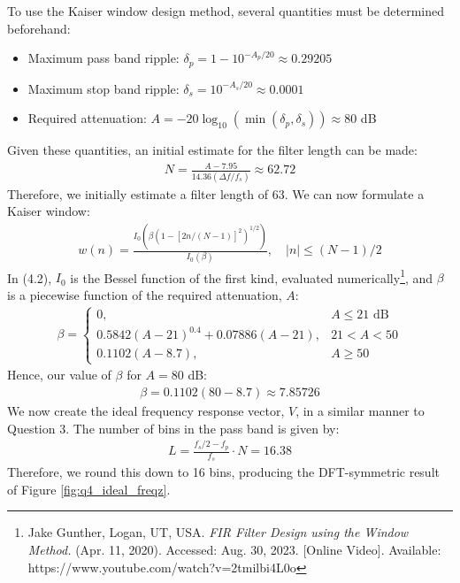 To use the Kaiser window design method, several quantities must be determined beforehand:
\begin{itemize}
    \item Maximum pass band ripple: $\delta_p = 1 - 10^{-A_p / 20} \approx 0.29205$
    \item Maximum stop band ripple: $\delta_s = 10^{-A_s / 20} \approx 0.0001$
    \item Required attenuation: $A = -20\log_{10}(\min(\delta_p, \delta_s)) \approx 80$ dB
\end{itemize}
Given these quantities, an initial estimate for the filter length can be made:
\begin{align}
    N = \frac{A - 7.95}{14.36(\Delta f / f_s)} \approx 62.72
\end{align}
Therefore, we initially estimate a filter length of 63. We can now formulate a Kaiser window:
\begin{align}
    w(n) = \frac{I_0(\beta(1 - [2n/(N-1)]^2)^{1/2})}{I_0(\beta)}, \quad |n| \leq (N-1)/2
\end{align}
In (4.2), $I_0$ is the Bessel function of the first kind, evaluated numerically\footnote{Jake Gunther, Logan, UT, USA. \textit{FIR Filter Design using the Window Method.} (Apr. 11, 2020). Accessed: Aug. 30, 2023. [Online Video]. Available: https://www.youtube.com/watch?v=2tmilbi4L0o}, and $\beta$ is a piecewise function of the required attenuation, $A$:
\begin{align}
    \beta = \begin{cases}
        0, & A \leq 21 \text{ dB} \\
        0.5842(A - 21)^{0.4} + 0.07886(A - 21), & 21 < A < 50 \\
        0.1102(A - 8.7), & A \geq 50
    \end{cases}
\end{align}
Hence, our value of $\beta$ for $A=80$ dB:
\begin{align}
    \beta = 0.1102(80 - 8.7) \approx 7.85726
\end{align}
We now create the ideal frequency response vector, $V$, in a similar manner to Question 3. The number of bins in the pass band is given by:
\begin{align}
    L = \frac{f_s/2 - f_p}{f_s} \cdot N = 16.38
\end{align}
Therefore, we round this down to 16 bins, producing the DFT-symmetric result of Figure \ref{fig:q4_ideal_freqz}.

\newpage

